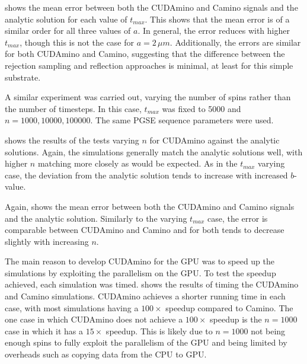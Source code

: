  shows the mean error between both the CUDAmino and Camino signals and the analytic solution for each value of $t_{max}$. This shows that the mean error is of a similar order for all three values of $a$. In general, the error reduces with higher $t_{max}$, though this is not the case for $a=2\,\mu m$. Additionally, the errors are similar for both CUDAmino and Camino, suggesting that the difference between the rejection sampling and reflection approaches is minimal, at least for this simple substrate. 

A similar experiment was carried out, varying the number of spins rather than the number of timesteps.
In this case, $t_{max}$ was fixed to 5000 and $n = 1000, 10000, 100000$.
The same \ac{PGSE} sequence parameters were used.

 shows the results of the tests varying $n$ for CUDAmino against the analytic solutions. Again, the simulations generally match the analytic solutions well, with higher $n$ matching more closely as would be expected. As in the $t_{max}$ varying case, the deviation from the analytic solution tends to increase with increased $b$-value.

Again,  shows the mean error between both the CUDAmino and Camino signals and the analytic solution.
Similarly to the varying $t_{max}$ case, the error is comparable between CUDAmino and Camino and for both tends to decrease slightly  with increasing $n$. 

The main reason to develop CUDAmino for the \ac{GPU} was to speed up the simulations by exploiting the parallelism on the \ac{GPU}.
To test the speedup achieved, each simulation was timed.
 shows the results of timing the CUDAmino and Camino simulations.
CUDAmino achieves a shorter running time in each case, with most simulations having a  $100\times$ speedup compared to Camino.
The one case in which CUDAmino does not achieve a $100\times$ speedup is the $n=1000$ case in which it has a $15\times$ speedup.
This is likely due to $n=1000$ not being enough spins to fully exploit the parallelism of the GPU and being limited by overheads such as copying data from the \ac{CPU} to \ac{GPU}.




